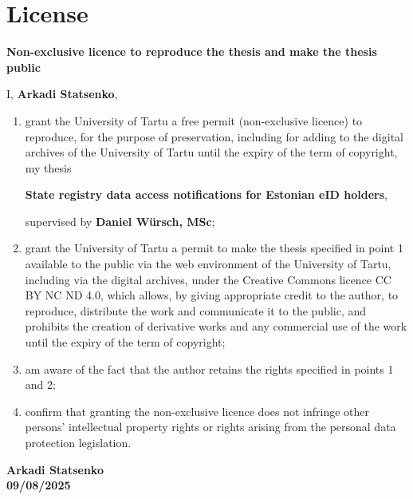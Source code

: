 \section*{License} \label{license} 

\textbf{Non-exclusive licence to reproduce the thesis and make the thesis public}

\vspace{1em}

I, \textbf{Arkadi Statsenko},

\vspace{0.5em}

\begin{enumerate}
    \item grant the University of Tartu a free permit (non-exclusive licence) to reproduce, for the purpose of preservation, including for adding to the digital archives of the University of Tartu until the expiry of the term of copyright, my thesis
    
    \textbf{State registry data access notifications for Estonian eID holders},
    
    supervised by \textbf{Daniel Würsch, MSc};
    
    \item grant the University of Tartu a permit to make the thesis specified in point 1 available to the public via the web environment of the University of Tartu, including via the digital archives, under the Creative Commons licence CC BY NC ND 4.0, which allows, by giving appropriate credit to the author, to reproduce, distribute the work and communicate it to the public, and prohibits the creation of derivative works and any commercial use of the work until the expiry of the term of copyright;
    
    \item am aware of the fact that the author retains the rights specified in points 1 and 2;
    
    \item confirm that granting the non-exclusive licence does not infringe other persons' intellectual property rights or rights arising from the personal data protection legislation.
\end{enumerate}

\vspace{2em}

\noindent
\textbf{Arkadi Statsenko} \\
\textbf{09/08/2025}

